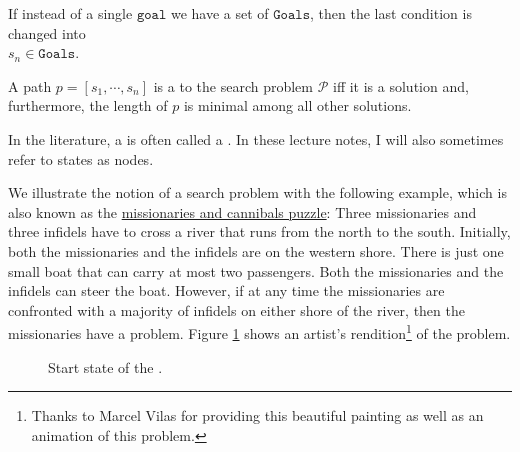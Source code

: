 \begin{Definition}
\begin{enumerate}
        If instead of a single $\texttt{goal}$ we have a set of $\texttt{Goals}$, then the last condition
        is changed into
        \\[0.2cm]
        \hspace*{1.3cm}
        $s_n \in \mathtt{Goals}$.
  \end{enumerate}
  A path $p = [s_1, \cdots, s_n]$ is a  to the search problem $\mathcal{P}$
  iff it is a solution and, furthermore, the length of $p$ is minimal among all other solutions. \eoxs
\end{Definition}

\remark
In the literature, a  is often called a .  
In these lecture notes, I will also sometimes refer to states as nodes.  \eoxs

\example
We illustrate the notion of a search problem with the following example, which is also known as the
\href{https://en.wikipedia.org/wiki/Missionaries_and_cannibals_problem}{missionaries and cannibals puzzle}:
Three missionaries and three infidels have to cross a river that runs from the north to the south.
Initially, both the missionaries and the infidels are on the western shore.  There is just one small boat 
that can carry at most two passengers.  Both the missionaries and the infidels can steer the boat.
However, if at any time the missionaries are confronted with a majority of infidels on either shore of the
river, then the missionaries have a problem.  Figure \ref{fig:missionaries-and-infidels.pdf} shows an 
artist's rendition\footnote{Thanks to Marcel Vilas for providing this beautiful painting as well as an
  animation of this problem.}
of the problem.

\begin{figure}[!ht]
  \centering
  \caption{Start state of the .}
  \label{fig:missionaries-and-infidels.pdf}
\end{figure}


